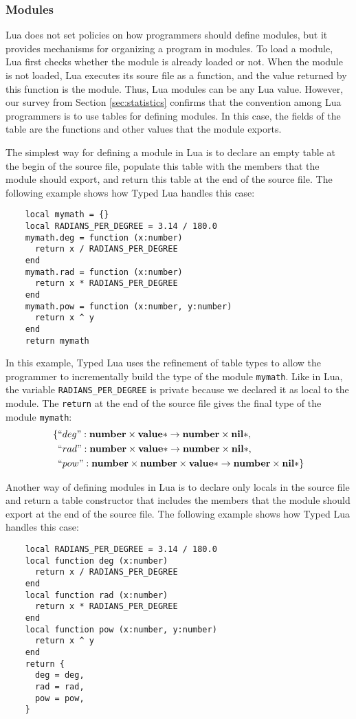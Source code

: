 \subsubsection{Modules}

Lua does not set policies on how programmers should define modules,
but it provides mechanisms for organizing a program in modules.
To load a module, Lua first checks whether the module is already
loaded or not.
When the module is not loaded, Lua executes its soure file as a
function, and the value returned by this function is the module.
Thus, Lua modules can be any Lua value.
However, our survey from Section \ref{sec:statistics} confirms that
the convention among Lua programmers is to use tables for defining modules. 
In this case, the fields of the table are the functions and other
values that the module exports.

The simplest way for defining a module in Lua is to declare an
empty table at the begin of the source file,
populate this table with the members that the module should export,
and return this table at the end of the source file. 
The following example shows how Typed Lua handles this case:
\begin{verbatim}
    local mymath = {}
    local RADIANS_PER_DEGREE = 3.14 / 180.0
    mymath.deg = function (x:number)
      return x / RADIANS_PER_DEGREE
    end
    mymath.rad = function (x:number)
      return x * RADIANS_PER_DEGREE
    end
    mymath.pow = function (x:number, y:number)
      return x ^ y
    end
    return mymath
\end{verbatim}

In this example, Typed Lua uses the refinement of table types to
allow the programmer to incrementally build the type of the
module \texttt{mymath}.
Like in Lua, the variable \texttt{RADIANS\string_PER\string_DEGREE}
is private because we declared it as local to the module. 
The \texttt{return} at the end of the source file gives the
final type of the module \texttt{mymath}:
\begin{align*}
\{ & ``deg":\mathbf{number} \times \mathbf{value}{*} \rightarrow \mathbf{number} \times \mathbf{nil}{*},\\
& ``rad":\mathbf{number} \times \mathbf{value}{*} \rightarrow \mathbf{number} \times \mathbf{nil}{*},\\
& ``pow":\mathbf{number} \times \mathbf{number} \times \mathbf{value}{*} \rightarrow \mathbf{number} \times \mathbf{nil}{*}\}
\end{align*}

Another way of defining modules in Lua is to declare only locals
in the source file and return a table constructor that includes
the members that the module should export at the end of the source file.
The following example shows how Typed Lua handles this case:
\begin{verbatim}
    local RADIANS_PER_DEGREE = 3.14 / 180.0
    local function deg (x:number)
      return x / RADIANS_PER_DEGREE
    end
    local function rad (x:number)
      return x * RADIANS_PER_DEGREE
    end
    local function pow (x:number, y:number)
      return x ^ y
    end
    return {
      deg = deg,
      rad = rad,
      pow = pow,
    }
\end{verbatim}

